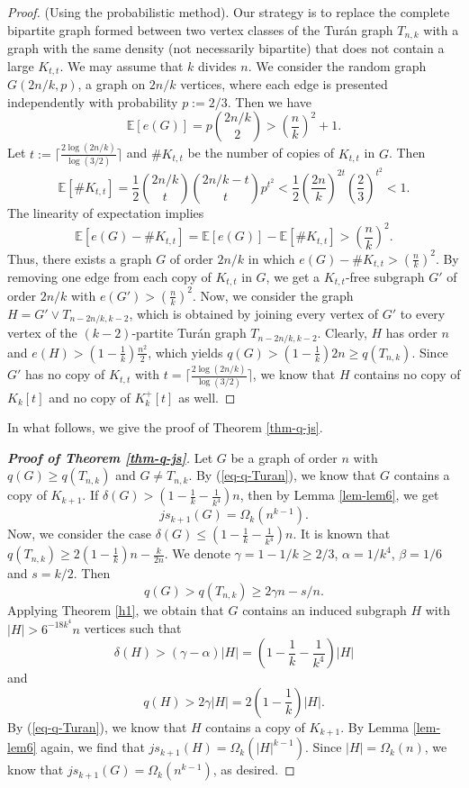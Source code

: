 \documentclass[11pt,a4paper]{article}
\theoremstyle{plain}
\theoremstyle{definition}
\begin{document}
\begin{proof}
(Using the probabilistic method).  
Our strategy is to replace the complete bipartite graph formed between two vertex classes of the Tur\'{a}n graph $T_{n,k}$ 	
  with a graph with the same density (not necessarily bipartite) that does not contain a large $K_{t,t}$. 
We may assume that $k$ divides $n$. 
We consider the random graph $G(2n/k,p)$, a graph on $2n/k$ vertices, 
where each edge is presented independently with probability $p:=2/3$. 
Then we have 
\[ \mathbb{E}[e(G)] = p {2n/k \choose 2} > 
\left(\frac{n}{k} \right)^2 +1. \]  
Let $t:=\big\lceil\frac{2\log (2n/k)}{\log (3/2)}\big\rceil$ and $\# K_{t,t}$ be the number of copies of $K_{t,t}$ in $G$. Then 
\[  \mathbb{E}[\# K_{t,t}] = \frac{1}{2} {2n/k \choose t} {2n/k -t \choose t} p^{t^2} 
<  \frac{1}{2} \left(\frac{2n}{k} \right)^{2t} 
\left(\frac{2}{3} \right)^{t^2} < 1. \]  
The linearity of expectation implies 
\[ \mathbb{E}[e(G)- \#K_{t,t}] = 
\mathbb{E}[e(G)] - \mathbb{E}[\#K_{t,t}] 
 > \left(\frac{n}{k} \right)^2.\]   
 Thus, there exists 
a graph $G$ of order $2n/k$ in which $e(G)- \#K_{t,t} > (\frac{n}{k})^2$. 
By removing one edge 
from each copy of $K_{t,t}$ in $G$, we get a $K_{t,t}$-free subgraph $G'$ of order $2n/k$ 
with $e(G')> (\frac{n}{k})^2$. Now, 
we consider the graph $H=G' \vee T_{n-{2n}/{k},k-2}$, 
which is obtained by joining every vertex of $G'$ to every vertex of the $(k-2)$-partite Tur\'{a}n graph $T_{n-{2n}/{k},k-2}$. 
Clearly, $H$ has order $n$ and $e(H)> (1- \frac{1}{k})\frac{n^2}{2}$, which yields $q(G)> (1- \frac{1}{k})2n \geq q(T_{n,k})$. 
Since $G'$ has no copy of $K_{t,t}$ with $t=\big\lceil\frac{2\log (2n/k)}{\log (3/2)}\big\rceil$, we know that $H$ contains no copy of $K_k[t]$ and no copy of $K_k^+[t]$ as well. 
\end{proof} 

  


In what follows, we give the proof of Theorem \ref{thm-q-js}. 

\begin{proof}[{\bf Proof of Theorem \ref{thm-q-js}}]
    Let $G$ be a graph of order $n$ with  $q(G)\ge q( T_{n,k})$ and $G\neq T_{n,k}$. 
By (\ref{eq-q-Turan}), we know that $G$ contains a copy of $K_{k+1}$. If $\delta(G)>(1- 
\frac{1}{k} - \frac{1}{k^{4}})n$, 
then by Lemma \ref{lem-lem6}, we get 
\[ js_{k+1}(G)=\Omega_k(n^{k-1}).\]  
Now, we consider the case 
$\delta(G)\leq (1- \frac{1}{k} - \frac{1}{k^4})n$. 
It is known that $q(T_{n,k}) \ge 2(1- \frac{1}{k})n- \frac{k}{2n}
$. We denote $\gamma=1-1/k\geq 2/3$, $\alpha=1/k^{4}$, $\beta=1/6$ and $s=k/2$. 
Then 
$$q(G)>q( T_{n,k})\ge 2\gamma n-s/n.$$ 
Applying Theorem \ref{h1}, we obtain that $G$ contains an induced subgraph $H$ with $|H|>6^{-18k^{4}} n$ vertices such that   
\[ \delta(H)>(\gamma-\alpha)|H| = 
\left(1- \frac{1}{k} - \frac{1}{k^4} \right)|H| \] 
and 
\[ q(H)>2\gamma |H|=2 \left(1- \frac{1}{k}\right)|H|. \]  
By (\ref{eq-q-Turan}),  
we know that $H$ contains a copy of $K_{k+1}$. 
By Lemma \ref{lem-lem6} again, we find that 
$js_{k+1}(H)=\Omega_k(|H|^{k-1})$. 
Since $|H|=\Omega_k(n)$, we know that 
$js_{k+1}(G)=\Omega_k (n^{k-1})$, as desired. 
\end{proof}
\end{document}
